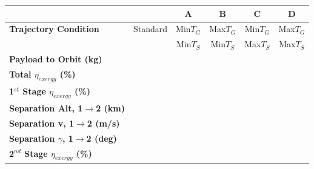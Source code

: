 \begin{table}[ht]
	\centering
	
	\begin{tabular}{l c c c c c} 
		& 
		& A
		& B
		& C
		& D
		\\
		\hline \textbf{Trajectory Condition}
		& Standard
		& Min$T_{G}$ 
		& Max$T_{G}$
		& Min$T_{G}$
		& Max$T_{G}$
		\\
		&
		&  Min$T_{S}$
		& Min$T_{S}$
		&Max$T_{S}$
		& Max$T_{S}$
		\\
		\hline \textbf{Payload to Orbit (kg)}
		& \textbf{\PayloadToOrbitqStandard}
		& \textbf{\PayloadToOrbitMinTGroundMinTStrat}
		& \textbf{\PayloadToOrbitMaxTGroundMinTStrat}
		& \textbf{\PayloadToOrbitMinTGroundMaxTStrat}
		& \textbf{\PayloadToOrbitMaxTGroundMaxTStrat}
		\\
		\textbf{Total $\eta_{exergy}$ (\%)}
		& \textbf{\totalExergyEffqStandard}
		& \textbf{\totalExergyEffMinTGroundMinTStrat}
		& \textbf{\totalExergyEffMaxTGroundMinTStrat}
		& \textbf{\totalExergyEffMinTGroundMaxTStrat}
		& \textbf{\totalExergyEffMaxTGroundMaxTStrat}
		\\
		\hline 
		\textbf{1$^{st}$ Stage $\eta_{exergy}$ (\%)}
		& \textbf{\firstExergyEffqStandard}
		& \textbf{\firstExergyEffMinTGroundMinTStrat}
		& \textbf{\firstExergyEffMaxTGroundMinTStrat}
		& \textbf{\firstExergyEffMinTGroundMaxTStrat}
		& \textbf{\firstExergyEffMaxTGroundMaxTStrat}
		\\
		\textbf{Separation Alt, 1$\rightarrow$2 (km)}
		& \firstsecondSeparationAltqStandard
		& \firstsecondSeparationAltMinTGroundMinTStrat
		& \firstsecondSeparationAltMaxTGroundMinTStrat
		& \firstsecondSeparationAltMinTGroundMaxTStrat
		& \firstsecondSeparationAltMaxTGroundMaxTStrat
		\\
		\textbf{Separation v, 1$\rightarrow$2 (m/s)}
		& \firstsecondSeparationvqStandard
		& \firstsecondSeparationvMinTGroundMinTStrat
		& \firstsecondSeparationvMaxTGroundMinTStrat
		& \firstsecondSeparationvMinTGroundMaxTStrat
		& \firstsecondSeparationvMaxTGroundMaxTStrat
		\\
		\textbf{Separation $\gamma$, 1$\rightarrow$2 (deg)}
		& \firstsecondSeparationgammaqStandard
		& \firstsecondSeparationgammaMinTGroundMinTStrat
		& \firstsecondSeparationgammaMaxTGroundMinTStrat
		& \firstsecondSeparationgammaMinTGroundMaxTStrat
		& \firstsecondSeparationgammaMaxTGroundMaxTStrat
		\\
		\hline 
		\textbf{2$^{nd}$ Stage $\eta_{exergy}$ (\%)}
		& \textbf{\secondExergyEffqStandard}
		& \textbf{\secondExergyEffMinTGroundMinTStrat}

\end{tabular}
\end{table}
